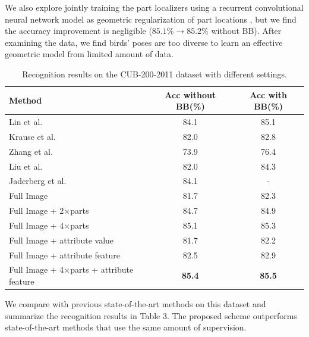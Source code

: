 \documentclass{article}
\begin{document}
We also explore jointly training the part localizers using a recurrent convolutional neural network model as  geometric regularization of part locations \cite{nips8},
but we find the accuracy improvement is negligible ($85.1\% \to 85.2\%$ without BB). After examining the data, we find birds’ poses are too diverse to learn an effective geometric model from limited amount of data.

\begin{table}[thb!]
\begin{small}
\begin{center}
\caption{Recognition results on the CUB-200-2011 dataset with different settings.}
\begin{tabular}
{l||c|c}\hline
Method & Acc without BB(\%) & Acc with BB(\%)\\\hline
Lin et al. \cite{bd16} &       84.1  &     85.1\\
Krause et al. \cite{bd22}  &   82.0 &      82.8\\
Zhang et al. \cite{bd11}  &73.9 &    76.4 \\
Liu et al. \cite{nips1}      & 82.0 &    84.3\\
Jaderberg et al. \cite{jaderberg2015spatial} & 84.1 & - \\
\hline
Full Image & 81.7  & 82.3\\
Full Image + 2$\times$parts & 84.7  & 84.9 \\
Full Image + 4$\times$parts & 85.1  & 85.3 \\
Full Image + attribute value & 81.7  &  82.2\\
Full Image + attribute feature & 82.5 &  82.9\\
Full Image + 4$\times$parts + attribute feature & \bf{85.4}  & \bf{85.5}  \\\hline
\end{tabular}
\end{center}
\end{small}
\end{table}


We compare with previous state-of-the-art methods on this dataset and summarize the recognition results in Table 3.
The proposed scheme outperforms state-of-the-art methods that use the same amount of supervision.
\end{document}
